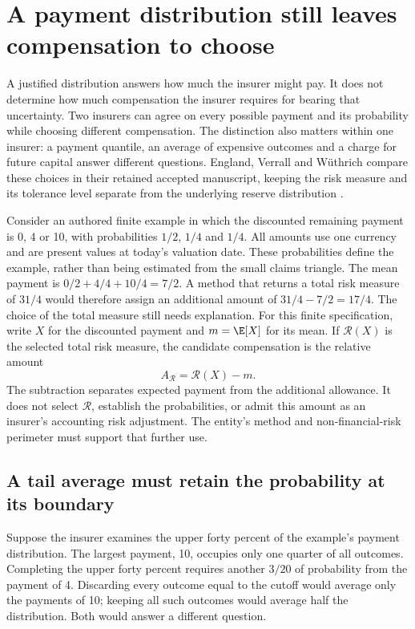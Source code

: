 \section{A payment distribution still leaves compensation to choose}
\label{sec:reserve-risk-measures}

A justified distribution answers how much the insurer might pay. It does not
determine how much compensation the insurer requires for bearing that
uncertainty. Two insurers can agree on every possible payment and its
probability while choosing different compensation. The distinction also
matters within one insurer: a payment quantile, an average of expensive
outcomes and a charge for future capital answer different questions.
England, Verrall and W\"uthrich compare these choices in their retained
accepted manuscript, keeping the risk measure and its tolerance level
separate from the underlying reserve distribution
\citep[Sections 5--6]{england2019lifetime}.

Consider an authored finite example in which the discounted remaining payment
is 0, 4 or 10, with probabilities $1/2$, $1/4$ and $1/4$. All amounts use one
currency and are present values at today's valuation date. These
probabilities define the example, rather than being estimated from the small
claims triangle. The mean payment is $0/2+4/4+10/4=7/2$. A method that returns
a total risk measure of $31/4$ would therefore assign an additional amount
of $31/4-7/2=17/4$. The choice of the total measure still needs explanation.
For this finite specification, write $X$ for the discounted payment and
$m=\E[X]$ for its mean. If $\mathcal R(X)$ is the selected total risk measure,
the candidate compensation is the relative amount
\[
 A_{\mathcal R}=\mathcal R(X)-m.
\]
The subtraction separates expected payment from the additional allowance.
It does not select $\mathcal R$, establish the probabilities, or admit this
amount as an insurer's accounting risk adjustment. The entity's method and
non-financial-risk perimeter must support that further use.

\subsection{A tail average must retain the probability at its boundary}

Suppose the insurer examines the upper forty percent of the example's payment
distribution. The largest payment, 10, occupies only one quarter of all
outcomes. Completing the upper forty percent requires another $3/20$ of
probability from the payment of 4. Discarding every outcome equal to the
cutoff would average only the payments of 10; keeping all such outcomes would
average half the distribution. Both would answer a different question.

